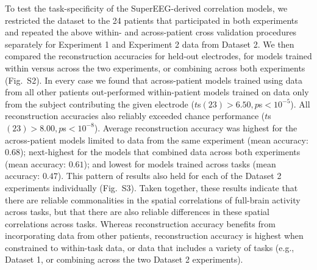 \documentclass[11pt]{article}
\newcommand{\perexptaskrecon}{S2}
\newcommand{\perexptaskreconseparated}{S3}
\begin{document}
To test the task-specificity of the SuperEEG-derived correlation
models, we restricted the dataset to the 24 patients that participated
in both experiments and repeated the above within- and across-patient
cross validation procedures separately for Experiment 1 and Experiment
2 data from Dataset 2.  We then compared the reconstruction accuracies
for held-out electrodes, for models trained within versus across the
two experiments, or combining across both experiments
(Fig.~\perexptaskrecon).  In every case we found that across-patient
models trained using data from all other patients out-performed
within-patient models trained on data only from the subject
contributing the given electrode ($t$s$(23) > 6.50, p$s$ < 10^{-5}$).
All reconstruction accuracies also reliably exceeded chance
performance ($t$s$(23) > 8.00, p$s$ < 10^{-8}$).  Average
reconstruction accuracy was highest for the across-patient models
limited to data from the same experiment (mean accuracy: $0.68$);
next-highest for the models that combined data across both experiments
(mean accuracy: $0.61$); and lowest for models trained across tasks
(mean accuracy: $0.47$).  This pattern of results also held for each
of the Dataset 2 experiments individually
(Fig.~\perexptaskreconseparated).  Taken together, these results
indicate that there are reliable commonalities in the spatial
correlations of full-brain activity across tasks, but that there are
also reliable differences in these spatial correlations across tasks.
Whereas reconstruction accuracy benefits from incorporating data from
other patients, reconstruction accuracy is highest when constrained to
within-task data, or data that includes a variety of tasks (e.g.,
Dataset 1, or combining across the two Dataset 2 experiments).
\end{document}
